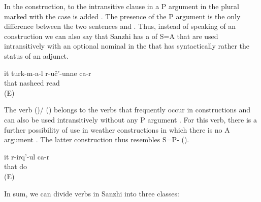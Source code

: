 In the  construction, to the intransitive clause in  a P argument in the plural marked with the  case is added . The presence of the P argument is the only difference between the two sentences  and . Thus, instead of speaking of an  construction we can also say that Sanzhi has a  of S=A  that are used intransitively with an optional nominal in the  that has syntactically rather the status of an adjunct.

\begin{exe}
	\ex	\label{ex:She reads (i.e. sings) nasheeds@varB}
	\gll	it	turk-m-a-l	r-uč'-unne	ca-r\\
		that	nasheed	read	\\
	\glt	{} (E)
\end{exe}

The verb  ()\slash{} ()  belongs to the verbs that frequently occur in  constructions  and can also be used intransitively without any P argument . For this verb, there is a further possibility of use in weather constructions in which there is no A argument . The latter construction thus resembles S=P- ().

\begin{exe}
	\ex	\label{ex:She is busy}
	\gll	it	r-irq'-ul	ca-r\\
		that	do	\\
	\glt	{} (E)
\end{exe}

In sum, we can divide verbs in Sanzhi into three classes:

